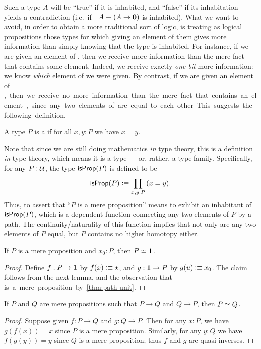 Such a type $A$ will be ``true'' if it is inhabited, and ``false'' if its inhabitation yields a contradiction (i.e.\ if $\neg A \equiv (A\to\mathbf{0})$ is inhabited).
%
What we want to avoid, in order to obtain a more traditional sort of logic, is treating as logical propositions those types for which giving an element of them gives more information than simply knowing that the type is inhabited.
For instance, if we are given an element of \bool, then we receive more information than the mere fact that \bool contains some element.
Indeed, we receive exactly \emph{one bit}
%
more information: we know \emph{which} element of \bool we were given.
By contrast, if we are given an element of \unit, then we receive no more information than the mere fact that \unit contains an element, since any two elements of \unit are equal to each other.
This suggests the following definition.

\begin{defn}\label{defn:isprop}
  A type $P$ is a 
  if for all $x,y:P$ we have $x=y$.
\end{defn}

Note that since we are still doing mathematics \emph{in} type theory, this is a definition \emph{in} type theory, which means it is a type --- or, rather, a type family.
Specifically, for any $P:\mathcal{U}$, the type $\mathsf{isProp}(P)$ is defined to be
\[ \isprop(P) \defeq \prd{x,y:P} (x=y). \]
Thus, to assert that ``$P$ is a mere proposition'' means to exhibit an inhabitant of $\mathsf{isProp}(P)$, which is a dependent function connecting any two elements of $P$ by a path.
The continuity/naturality of this function implies that not only are any two elements of $P$ equal, but $P$ contains no higher homotopy either.

\begin{lem}\label{thm:inhabprop-eqvunit}
  If $P$ is a mere proposition and $x_0:P$, then $P \simeq \mathbf{1}$.
\end{lem}
\begin{proof}
  Define $f:P\to\mathbf{1}$ by $f(x)\vcentcolon\equiv \star$, and $g:\mathbf{1}\to P$ by $g(u)\vcentcolon\equiv x_0$.
  The claim follows from the next lemma, and the observation that \unit is a mere proposition by \cref{thm:path-unit}.
\end{proof}

\begin{lem}\label{lem:equiv-iff-hprop}
  If $P$ and $Q$ are mere propositions such that $P\to Q$ and $Q\to P$, then $P \simeq Q$.
\end{lem}
\begin{proof}
  Suppose given $f:P\to Q$ and $g:Q\to P$.
  Then for any $x:P$, we have $g(f(x))=x$ since $P$ is a mere proposition.
  Similarly, for any $y:Q$ we have $f(g(y))=y$ since $Q$ is a mere proposition; thus $f$ and $g$ are quasi-inverses.
\end{proof}

